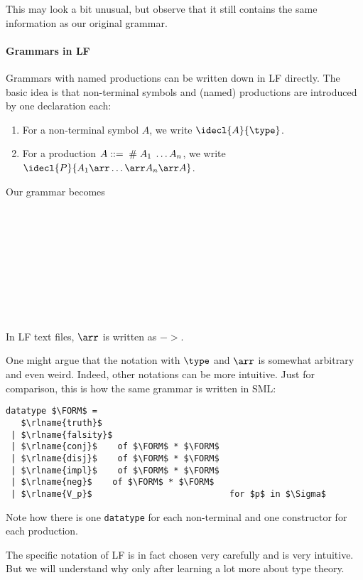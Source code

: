 This may look a bit unusual, but observe that it still contains the same information as our original grammar.

\paragraph{Grammars in LF}
Grammars with named productions can be written down in LF directly. The basic idea is that non-terminal symbols and (named) productions are introduced by one declaration each:
\begin{enumerate}
\item For a non-terminal symbol $A$, we write $\idecl{A}{\type}$.
\item For a production $A::=\;\#\; A_1\;\ldots A_n$, we write $\idecl{P}{A_1\arr\ldots\arr A_n\arr A}$.
\end{enumerate}

Our grammar becomes
\begin{twelfsig}
\decl{\FORM}{\type} \\
\\
\\
\\
\\
\\
\\
\\
\end{twelfsig}
In LF text files, $\arr$ is written as $-\!\!>$.

One might argue that the notation with $\type$ and $\arr$ is somewhat arbitrary and even weird. Indeed, other notations can be more intuitive. Just for comparison, this is how the same grammar is written in SML:
\begin{lstlisting}[mathescape]
datatype $\FORM$ =
   $\rlname{truth}$
 | $\rlname{falsity}$
 | $\rlname{conj}$    of $\FORM$ * $\FORM$
 | $\rlname{disj}$    of $\FORM$ * $\FORM$
 | $\rlname{impl}$    of $\FORM$ * $\FORM$
 | $\rlname{neg}$    of $\FORM$ * $\FORM$
 | $\rlname{V_p}$                           for $p$ in $\Sigma$
\end{lstlisting}
Note how there is one \lstinline|datatype| for each non-terminal and one constructor for each production.

The specific notation of LF is in fact chosen very carefully and is very intuitive. But we will understand why only after learning a lot more about type theory.

